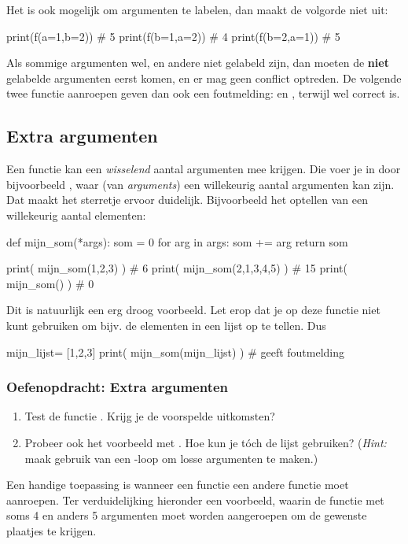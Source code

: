 \documentclass[a4paper,11pt, fleqn]{article}
\begin{document}
Het is ook mogelijk om argumenten te labelen, dan maakt de volgorde niet uit:
\begin{python}  
print(f(a=1,b=2)) # 5
print(f(b=1,a=2)) # 4
print(f(b=2,a=1)) # 5
\end{python}
Als sommige argumenten wel, en andere niet gelabeld zijn, dan moeten de {\bf niet} gelabelde argumenten eerst komen, en er mag geen conflict optreden. De volgende twee functie aanroepen geven dan ook een foutmelding:  en , terwijl  wel correct is.

\subsection{Extra argumenten}
Een functie kan een {\it wisselend} aantal argumenten mee krijgen. Die voer je in door bijvoorbeeld , waar  (van {\it arguments}) een willekeurig aantal argumenten kan zijn. Dat maakt het sterretje ervoor duidelijk.
Bijvoorbeeld het optellen van een willekeurig aantal elementen:
\begin{python}
def mijn_som(*args):
    som = 0
    for arg in args:
        som += arg
    return som

print( mijn_som(1,2,3) )     #  6    
print( mijn_som(2,1,3,4,5) ) # 15
print( mijn_som() )          #  0    
\end{python}
Dit is natuurlijk een erg droog voorbeeld. Let erop dat je op deze functie niet kunt gebruiken om bijv. de elementen in een lijst op te tellen. Dus 
\begin{python}
mijn_lijst= [1,2,3]
print( mijn_som(mijn_lijst) )     # geeft foutmelding
\end{python}

\subsubsection*{Oefenopdracht: Extra argumenten}
\begin{enumerate}[label=(\alph*)]
\item Test de functie . Krijg je de voorspelde uitkomsten?
\item Probeer ook het voorbeeld met . Hoe kun je t\'och de lijst gebruiken? (\textit{Hint:} maak gebruik van een -loop om losse argumenten te maken.)
\end{enumerate}

Een handige toepassing is wanneer een functie een andere functie moet aanroepen. Ter verduidelijking hieronder een voorbeeld, waarin de functie  met soms 4 en anders 5 argumenten moet worden aangeroepen om de gewenste plaatjes te krijgen.
\end{document}
